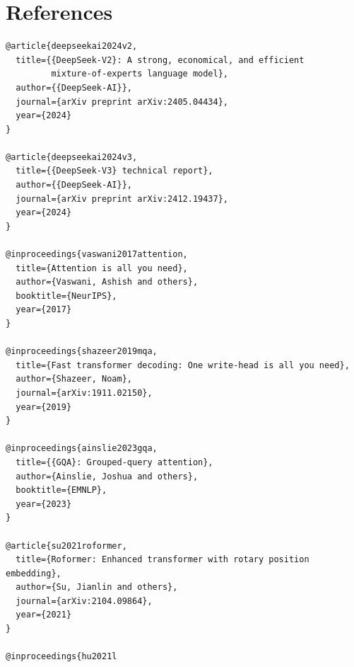 
\section{References}

\begin{lstlisting}
@article{deepseekai2024v2,
  title={{DeepSeek-V2}: A strong, economical, and efficient 
         mixture-of-experts language model},
  author={{DeepSeek-AI}},
  journal={arXiv preprint arXiv:2405.04434},
  year={2024}
}

@article{deepseekai2024v3,
  title={{DeepSeek-V3} technical report},
  author={{DeepSeek-AI}},
  journal={arXiv preprint arXiv:2412.19437},
  year={2024}
}

@inproceedings{vaswani2017attention,
  title={Attention is all you need},
  author={Vaswani, Ashish and others},
  booktitle={NeurIPS},
  year={2017}
}

@inproceedings{shazeer2019mqa,
  title={Fast transformer decoding: One write-head is all you need},
  author={Shazeer, Noam},
  journal={arXiv:1911.02150},
  year={2019}
}

@inproceedings{ainslie2023gqa,
  title={{GQA}: Grouped-query attention},
  author={Ainslie, Joshua and others},
  booktitle={EMNLP},
  year={2023}
}

@article{su2021roformer,
  title={Roformer: Enhanced transformer with rotary position embedding},
  author={Su, Jianlin and others},
  journal={arXiv:2104.09864},
  year={2021}
}

@inproceedings{hu2021l
\end{lstlisting}